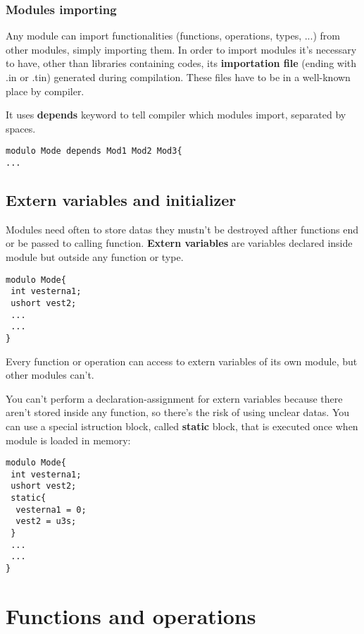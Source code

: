 \documentclass[10pt]{book}%
\renewcommand{\emph}[1]{\textbf{#1}}
\newenvironment{codeenv}{
\begin{mdframed}[backgroundcolor=black!20,topline=false,leftline=false,rightline=false,bottomline=false]
}
{\end{mdframed}}
\begin{document}
\subsection{Modules importing}
Any module can import functionalities (functions, operations, types, ...) from other modules, simply importing them. In order to import modules it's necessary to have, other than libraries containing codes, its \emph{importation file} (ending with .in or .tin) generated during compilation. These files have to be in a well-known place by compiler.

It uses \emph{depends} keyword to tell compiler which modules import, separated by spaces.
\begin{codeenv}
\begin{verbatim}
modulo Mode depends Mod1 Mod2 Mod3{
...
\end{verbatim}
\end{codeenv}

\section{Extern variables and initializer}
Modules need often to store datas they mustn't be destroyed afther functions end or be passed to calling function. \emph{Extern variables} are variables declared inside module but outside any function or type.
\begin{codeenv}
\begin{verbatim}
modulo Mode{
 int vesterna1;
 ushort vest2;
 ...
 ...
}
\end{verbatim}
\end{codeenv}
Every function or operation can access to extern variables of its own module, but other modules can't.

You can't perform a declaration-assignment for extern variables because there aren't stored inside any function, so there's the risk of using unclear datas. You can use a special istruction block, called \emph{static} block, that is executed once when module is loaded in memory:
\begin{codeenv}
\begin{verbatim}
modulo Mode{
 int vesterna1;
 ushort vest2;
 static{
  vesterna1 = 0;
  vest2 = u3s;
 }
 ...
 ...
}
\end{verbatim}
\end{codeenv}

\chapter{Functions and operations}
\end{document}
